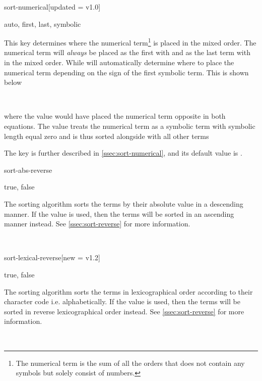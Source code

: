 \begin{option}{sort-numerical}[updated = v1.0]
	\begin{values}[default = auto]
		auto, first, last, symbolic
	\end{values}
	This key determines where the numerical term\footnote{The numerical term is the sum of all the orders that does not contain any symbols but solely consist of numbers.\label{foot:numerical-term}} is placed in the mixed order. The numerical term will \emph{always} be placed as the first with  and as the last term with  in the mixed order. While  will automatically determine where to place the numerical term depending on the sign of the first symbolic term. This is shown below
	\begin{example}
		  \\
	\end{example}
	where the value  would have placed the numerical term opposite in both equations. The value  treats the numerical term as a symbolic term with symbolic length equal zero and is thus sorted alongside with all other terms
	\begin{example}
		\pdv[sort-numerical=symbolic, order={2+n,-a}]{f}{x,y}
	\end{example}
	The key is further described in \cref{ssec:sort-numerical}, and its default value is \default.
\end{option}

\begin{option}{sort-abs-reverse}
	\begin{values}[default = false]
		true, false
	\end{values}
	The sorting algorithm  sorts the terms by their absolute value in a descending manner. If the value  is used, then the terms will be sorted in an ascending manner instead. See \cref{ssec:sort-reverse} for more information.
	\begin{example}
		\pdv[sort-abs-reverse=false, sort-method=abs, order=2a-3b]{f}{x} \\
		\pdv[sort-abs-reverse=true, sort-method=abs, order=2a-3b]{f}{x}
	\end{example}
\end{option}

\begin{option}{sort-lexical-reverse}[new = v1.2]
	\begin{values}[default = false]
		true, false
	\end{values}
	The sorting algorithm  sorts the terms in lexicographical order according to their character code i.e. alphabetically. If the value  is used, then the terms will be sorted in reverse lexicographical order instead. See \cref{ssec:sort-reverse} for more information.
	\begin{example}
		\pdv[sort-lexical-reverse=false, sort-method=lexical, order=a+b]{f}{x} \\
		\pdv[, sort-lexical-reverse=true, sort-method=lexical, order=a+b]{f}{x}
	\end{example}
\end{option}

